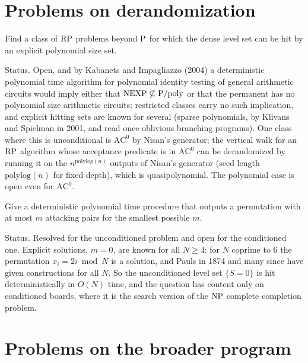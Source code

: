 \section{Problems on derandomization}

\begin{problem}
Find a class of $\mathrm{RP}$ problems beyond $\mathrm{P}$ for which the dense level set can be hit by an explicit polynomial size set.
\end{problem}

Status. Open, and by Kabanets and Impagliazzo (2004) a deterministic polynomial time algorithm for polynomial identity testing of general arithmetic circuits would imply either that $\mathrm{NEXP} \not\subseteq \mathrm{P}/\mathrm{poly}$ or that the permanent has no polynomial size arithmetic circuits; restricted classes carry no such implication, and explicit hitting sets are known for several (sparse polynomials, by Klivans and Spielman in 2001, and read once oblivious branching programs). One class where this is unconditional is $\mathrm{AC}^0$ by Nisan's generator; the vertical walk for an $\mathrm{RP}$ algorithm whose acceptance predicate is in $\mathrm{AC}^0$ can be derandomized by running it on the $n^{\mathrm{polylog}(n)}$ outputs of Nisan's generator (seed length $\mathrm{polylog}(n)$ for fixed depth), which is quasipolynomial. The polynomial case is open even for $\mathrm{AC}^0$.

\begin{problem}
Give a deterministic polynomial time procedure that outputs a permutation with at most $m$ attacking pairs for the smallest possible $m$.
\end{problem}

Status. Resolved for the unconditioned problem and open for the conditioned one. Explicit solutions, $m = 0$, are known for all $N \ge 4$: for $N$ coprime to $6$ the permutation $x_i = 2i \bmod N$ is a solution, and Pauls in 1874 and many since have given constructions for all $N$. So the unconditioned level set $\{ S = 0 \}$ is hit deterministically in $O(N)$ time, and the question has content only on conditioned boards, where it is the search version of the $\mathrm{NP}$ complete completion problem.

\section{Problems on the broader program}

